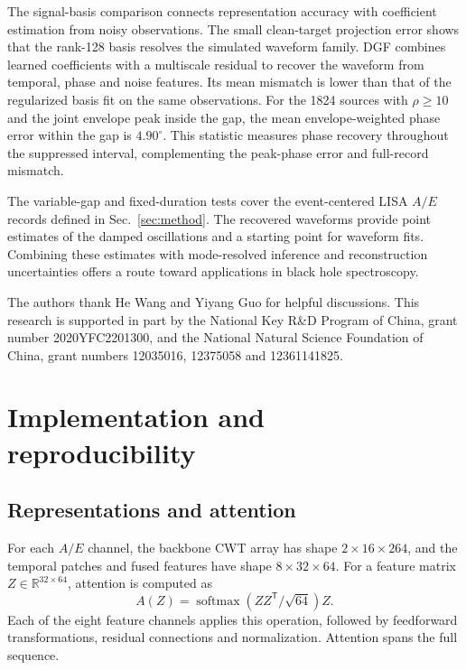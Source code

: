 \documentclass[10pt,prd,aps,a4paper,twocolumn,superscriptaddress,nofootinbib,floatfix]{revtex4-2}
\begin{document}
The signal-basis comparison connects representation accuracy with coefficient estimation from noisy observations. The small clean-target projection error shows that the rank-128 basis resolves the simulated waveform family. DGF combines learned coefficients with a multiscale residual to recover the waveform from temporal, phase and noise features. Its mean mismatch is lower than that of the regularized basis fit on the same observations. For the 1824 sources with $\rho\ge10$ and the joint envelope peak inside the gap, the mean envelope-weighted phase error within the gap is $4.90^\circ$. This statistic measures phase recovery throughout the suppressed interval, complementing the peak-phase error and full-record mismatch.

The variable-gap and fixed-duration tests cover the event-centered LISA $A/E$ records defined in Sec.~\ref{sec:method}. The recovered waveforms provide point estimates of the damped oscillations and a starting point for waveform fits. Combining these estimates with mode-resolved inference and reconstruction uncertainties offers a route toward applications in black hole spectroscopy.

\begin{acknowledgments}
The authors thank He Wang and Yiyang Guo for helpful discussions. This research is supported in part by the National Key R\&D Program of China, grant number 2020YFC2201300, and the National Natural Science Foundation of China, grant numbers 12035016, 12375058 and 12361141825.

\end{acknowledgments}
\onecolumngrid
\clearpage
\twocolumngrid
\appendix
\section{Implementation and reproducibility}\label{app:model_analysis}
\subsection{Representations and attention}
For each $A/E$ channel, the backbone CWT array has shape $2\times16\times264$, and the temporal patches and fused features have shape $8\times32\times64$. For a feature matrix $Z\in\mathbb R^{32\times64}$, attention is computed as
\begin{equation}
A(Z)=\operatorname{softmax}(ZZ^{\mathsf T}/\sqrt{64})Z.
\end{equation}
Each of the eight feature channels applies this operation, followed by feedforward transformations, residual connections and normalization. Attention spans the full sequence.
\end{document}
